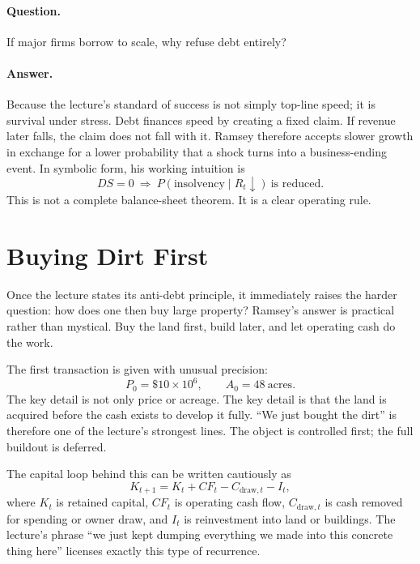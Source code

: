 \paragraph{Question.} If major firms borrow to scale, why refuse debt entirely?

\paragraph{Answer.} Because the lecture's standard of success is not simply top-line speed; it is survival under stress. Debt finances speed by creating a fixed claim. If revenue later falls, the claim does not fall with it. Ramsey therefore accepts slower growth in exchange for a lower probability that a shock turns into a business-ending event. In symbolic form, his working intuition is
\begin{equation}
DS=0 \ \Rightarrow\ P(\text{insolvency}\mid R_t\downarrow)\ \text{is reduced}.
\end{equation}
This is not a complete balance-sheet theorem. It is a clear operating rule.

\section{Buying Dirt First}

Once the lecture states its anti-debt principle, it immediately raises the harder question: how does one then buy large property? Ramsey's answer is practical rather than mystical. Buy the land first, build later, and let operating cash do the work.

The first transaction is given with unusual precision:
\begin{equation}
P_0=\$10 \times 10^6,\qquad A_0=48\ \text{acres}.
\end{equation}
The key detail is not only price or acreage. The key detail is that the land is acquired before the cash exists to develop it fully. ``We just bought the dirt'' is therefore one of the lecture's strongest lines. The object is controlled first; the full buildout is deferred.

The capital loop behind this can be written cautiously as
\begin{equation}
K_{t+1}=K_t+CF_t-C_{\mathrm{draw},t}-I_t,
\end{equation}
where \(K_t\) is retained capital, \(CF_t\) is operating cash flow, \(C_{\mathrm{draw},t}\) is cash removed for spending or owner draw, and \(I_t\) is reinvestment into land or buildings. The lecture's phrase ``we just kept dumping everything we made into this concrete thing here'' licenses exactly this type of recurrence.

